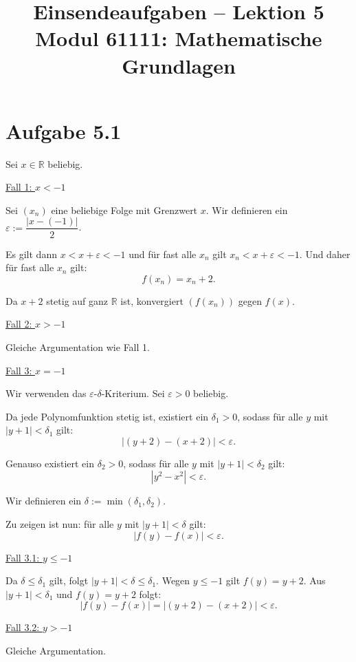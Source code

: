 \documentclass[a4paper,12pt]{article}
\title{Einsendeaufgaben -- Lektion 5\\[0.5em]
\large Modul 61111: Mathematische Grundlagen}
\author{}
\date{}
\newcommand{\fall}[1]{\par\medskip\noindent\underline{#1}\par\nopagebreak\smallskip}
\begin{document}
\maketitle

\section*{Aufgabe 5.1}

Sei $x \in \mathbb{R}$ beliebig.

\fall{Fall 1: $x < -1$}

Sei $(x_n)$ eine beliebige Folge mit Grenzwert $x$.
Wir definieren ein $\varepsilon := \dfrac{|x - (-1)|}{2}$.

Es gilt dann $x < x + \varepsilon < -1$ und für fast alle $x_n$ gilt $x_n < x + \varepsilon < -1$.
Und daher für fast alle $x_n$ gilt:
\[
    f(x_n) = x_n + 2.
\]

Da $x + 2$ stetig auf ganz $\mathbb{R}$ ist, konvergiert $(f(x_n))$ gegen $f(x)$.

\fall{Fall 2: $x > -1$}

Gleiche Argumentation wie Fall 1.

\fall{Fall 3: $x = -1$}

Wir verwenden das $\varepsilon$-$\delta$-Kriterium.
Sei $\varepsilon > 0$ beliebig.

Da jede Polynomfunktion stetig ist, existiert ein $\delta_1 > 0$, sodass
für alle $y$ mit $|y + 1| < \delta_1$ gilt:
\[
    |(y + 2) - (x + 2)| < \varepsilon.
\]

Genauso existiert ein $\delta_2 > 0$, sodass
für alle $y$ mit $|y + 1| < \delta_2$ gilt:
\[
    |y^2 - x^2| < \varepsilon.
\]

Wir definieren ein $\delta := \min(\delta_1, \delta_2)$.

Zu zeigen ist nun: für alle $y$ mit $|y + 1| < \delta$ gilt:
\[
    |f(y) - f(x)| < \varepsilon.
\]

\fall{Fall 3.1: $y \leq -1$}

Da $\delta \leq \delta_1$ gilt, folgt $|y + 1| < \delta \leq \delta_1$.
Wegen $y \leq -1$ gilt $f(y) = y + 2$.
Aus $|y + 1| < \delta_1$ und $f(y) = y + 2$ folgt:
\[
    |f(y) - f(x)| = |(y + 2) - (x + 2)| < \varepsilon.
\]

\fall{Fall 3.2: $y > -1$}

Gleiche Argumentation.
\end{document}
